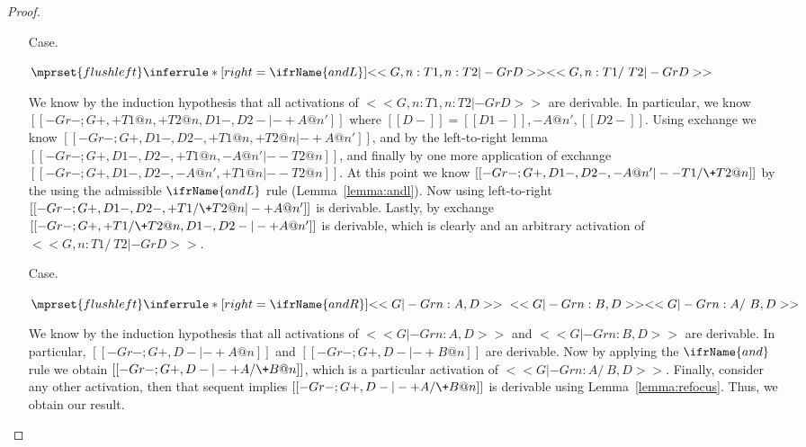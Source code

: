 \begin{proof}
\begin{itemize}
  \item[Case.]\ \\ 
    \begin{center}
      \begin{math}
        $$\mprset{flushleft}
        \inferrule* [right=\ifrName{andL}] {
          <<G , n : T1, n : T2 |- Gr D>>
        }{<<G , n : T1 /\ T2   |- Gr D>>}
      \end{math}
    \end{center}
        We know by the induction hypothesis that all activations of $<<G , n : T1, n : T2 |- Gr D>>$
    are derivable.  In particular, we know $[[-Gr- ; {G}+,+T1@n, +T2@n, {D1}-,{D2}- |- + A @ n']]$ where
    $[[{D}-]] = [[{D1}-]],-A@n',[[{D2}-]]$. Using exchange we know $[[-Gr- ; {G}+,{D1}-,{D2}-,+T1@n, +T2@n |- + A @ n']]$, and
    by the left-to-right lemma $[[-Gr- ; {G}+, {D1}-,{D2}-, +T1@n, - A @ n' |- - T2@n]]$, and finally by one more application
    of exchange $[[-Gr- ; {G}+, {D1}-, {D2}-,- A @ n', +T1@n |- - T2@n]]$.  At this point we know 
    $[[-Gr- ; {G}+, {D1}-, {D2}-, - A @ n' |- - T1 /\+ T2 @ n]]$ by the using the admissible $\ifrName{andL}$ rule (Lemma~\ref{lemma:andl}).
    Now using left-to-right \\
    $[[-Gr- ; {G}+, {D1}-, {D2}-, + T1 /\+ T2 @ n  |- + A @ n']]$ is derivable. Lastly, by exchange 
    $[[-Gr- ; {G}+, + T1 /\+ T2 @ n, {D1}-, {D2}- |- + A @ n']]$ is derivable, which is clearly and an arbitrary
    activation of $<<G , n : T1 /\ T2   |- Gr D>>$.

  \item[Case.]\ \\ 
    \begin{center}
      \begin{math}
        $$\mprset{flushleft}
        \inferrule* [right=\ifrName{andR}] {
          <<G |- Gr n : A, D>>
          \\\\
          <<G |- Gr n : B, D>>
        }{<<G |- Gr n : A /\ B, D>>}
      \end{math}
    \end{center}
    We know by the induction hypothesis that all activations of $<<G |- Gr n : A, D>>$ and
    $<<G |- Gr n : B, D>>$ are derivable.  In particular, $[[-Gr- ; {G}+,{D}- |- +A @ n]]$
    and $[[-Gr- ; {G}+,{D}- |- +B @ n]]$ are derivable. Now by applying the $\ifrName{and}$ rule
    we obtain $[[-Gr- ; {G}+,{D}- |- + A /\+ B @ n]]$, which is a particular activation of 
    $<<G |- Gr n : A /\ B, D>>$. Finally, consider any other activation, then that sequent implies 
    $[[-Gr- ; {G}+,{D}- |- + A /\+ B @ n]]$ is derivable using Lemma~\ref{lemma:refocus}.  
    Thus, we obtain our result.


\end{itemize}
\end{proof}
